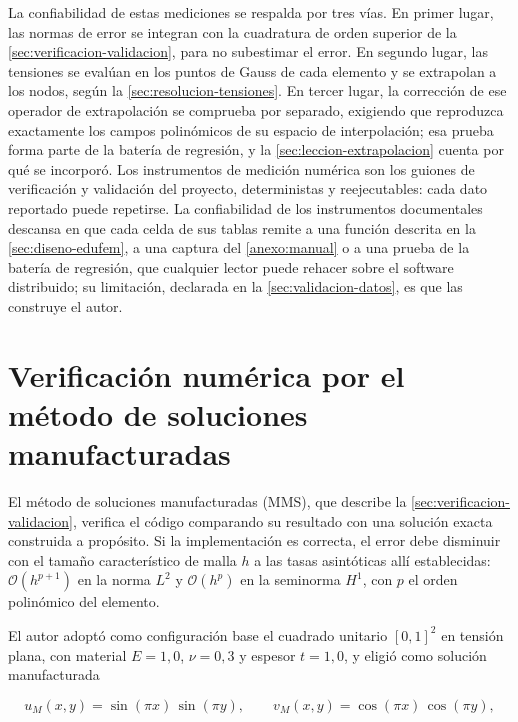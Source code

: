 La confiabilidad de estas mediciones se respalda por tres vías. En primer lugar, las normas de error se integran con la cuadratura de orden superior de la \autoref{sec:verificacion-validacion}, para no subestimar el error. En segundo lugar, las tensiones se evalúan en los puntos de Gauss de cada elemento y se extrapolan a los nodos, según la \autoref{sec:resolucion-tensiones}. En tercer lugar, la corrección de ese operador de extrapolación se comprueba por separado, exigiendo que reproduzca exactamente los campos polinómicos de su espacio de interpolación; esa prueba forma parte de la batería de regresión, y la \autoref{sec:leccion-extrapolacion} cuenta por qué se incorporó. Los instrumentos de medición numérica son los guiones de verificación y validación del proyecto, deterministas y reejecutables: cada dato reportado puede repetirse. La confiabilidad de los instrumentos documentales descansa en que cada celda de sus tablas remite a una función descrita en la \autoref{sec:diseno-edufem}, a una captura del \autoref{anexo:manual} o a una prueba de la batería de regresión, que cualquier lector puede rehacer sobre el software distribuido; su limitación, declarada en la \autoref{sec:validacion-datos}, es que las construye el autor.

\section{Verificación numérica por el método de soluciones manufacturadas}
\label{sec:mms}

El método de soluciones manufacturadas (MMS), que describe la \autoref{sec:verificacion-validacion}, verifica el código comparando su resultado con una solución exacta construida a propósito. Si la implementación es correcta, el error debe disminuir con el tamaño característico de malla $h$ a las tasas asintóticas allí establecidas: $\mathcal{O}(h^{p+1})$ en la norma $L^2$ y $\mathcal{O}(h^{p})$ en la seminorma $H^1$, con $p$ el orden polinómico del elemento.

El autor adoptó como configuración base el cuadrado unitario $[0,1]^2$ en tensión plana, con material $E = 1{,}0$, $\nu = 0{,}3$ y espesor $t = 1{,}0$, y eligió como solución manufacturada

\begin{equation}
u_M(x,y) = \sin(\pi x)\,\sin(\pi y), \qquad v_M(x,y) = \cos(\pi x)\,\cos(\pi y),
\label{eq:mms-solucion}
\end{equation}

